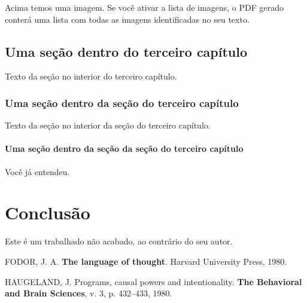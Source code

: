 \documentclass[
  12pt,
  a4paper,
  oneside,
  openright,
  sumario=abnt-6027-2012,
  english,
  brazil]{abntex2}
\newlength{\cslhangindent}
\newenvironment{CSLReferences}[2] %
 {\begin{list}{}{%
  \setlength{\itemindent}{0pt}
  \setlength{\leftmargin}{0pt}
  \setlength{\parsep}{0pt}
  \ifodd #1
   \setlength{\leftmargin}{\cslhangindent}
   \setlength{\itemindent}{-1\cslhangindent}
  \fi
  \setlength{\itemsep}{#2\baselineskip}}}
 {\end{list}}
\begin{document}
Acima temos uma imagem. Se você ativar a lista de imagens, o PDF gerado
conterá uma lista com todas as imagens identificadas no seu texto.

\section{Uma seção dentro do terceiro
capítulo}\label{uma-seuxe7uxe3o-dentro-do-terceiro-capuxedtulo}

Texto da seção no interior do terceiro capítulo.

\subsection{Uma seção dentro da seção do terceiro
capítulo}\label{uma-seuxe7uxe3o-dentro-da-seuxe7uxe3o-do-terceiro-capuxedtulo}

Texto da seção no interior da seção do terceiro capítulo.

\subsubsection{Uma seção dentro da seção da seção do terceiro
capítulo}\label{uma-seuxe7uxe3o-dentro-da-seuxe7uxe3o-da-seuxe7uxe3o-do-terceiro-capuxedtulo}

Você já entendeu.

\chapter*{Conclusão}\label{conclusuxe3o}

Este é um trabalhado não acabado, ao contrário do seu autor.

\label{refs}
\begin{CSLReferences}{0}{1}
FODOR, J. A. \textbf{The language of thought}. Harvard University Press,
1980.

HAUGELAND, J. Programs, causal powers and intentionality. \textbf{The
Behavioral and Brain Sciences}, v. 3, p. 432--433, 1980.

\end{CSLReferences}
\end{document}
